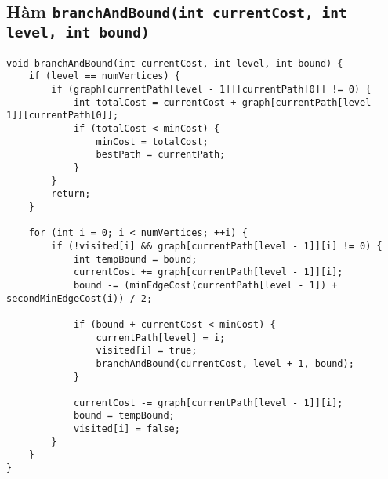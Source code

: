 \documentclass[a4paper]{article}
\begin{document}
\subsection*{Hàm \texttt{branchAndBound(int currentCost, int level, int bound)}}
\begin{lstlisting}[style=cppstyle]
void branchAndBound(int currentCost, int level, int bound) {
    if (level == numVertices) {
        if (graph[currentPath[level - 1]][currentPath[0]] != 0) {
            int totalCost = currentCost + graph[currentPath[level - 1]][currentPath[0]];
            if (totalCost < minCost) {
                minCost = totalCost;
                bestPath = currentPath;
            }
        }
        return;
    }

    for (int i = 0; i < numVertices; ++i) {
        if (!visited[i] && graph[currentPath[level - 1]][i] != 0) {
            int tempBound = bound;
            currentCost += graph[currentPath[level - 1]][i];
            bound -= (minEdgeCost(currentPath[level - 1]) + secondMinEdgeCost(i)) / 2;

            if (bound + currentCost < minCost) {
                currentPath[level] = i;
                visited[i] = true;
                branchAndBound(currentCost, level + 1, bound);
            }

            currentCost -= graph[currentPath[level - 1]][i];
            bound = tempBound;
            visited[i] = false;
        }
    }
}
\end{lstlisting}
\end{document}
